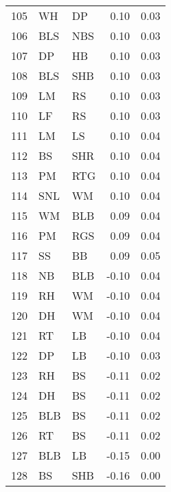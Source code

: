 \begin{table}[ht]
\begin{tabular}{rllrr}
  105 & WH & DP & 0.10 & 0.03 \\ 
  106 & BLS & NBS & 0.10 & 0.03 \\ 
  107 & DP & HB & 0.10 & 0.03 \\ 
  108 & BLS & SHB & 0.10 & 0.03 \\ 
  109 & LM & RS & 0.10 & 0.03 \\ 
  110 & LF & RS & 0.10 & 0.03 \\ 
  111 & LM & LS & 0.10 & 0.04 \\ 
  112 & BS & SHR & 0.10 & 0.04 \\ 
  113 & PM & RTG & 0.10 & 0.04 \\ 
  114 & SNL & WM & 0.10 & 0.04 \\ 
  115 & WM & BLB & 0.09 & 0.04 \\ 
  116 & PM & RGS & 0.09 & 0.04 \\ 
  117 & SS & BB & 0.09 & 0.05 \\ 
  118 & NB & BLB & -0.10 & 0.04 \\ 
  119 & RH & WM & -0.10 & 0.04 \\ 
  120 & DH & WM & -0.10 & 0.04 \\ 
  121 & RT & LB & -0.10 & 0.04 \\ 
  122 & DP & LB & -0.10 & 0.03 \\ 
  123 & RH & BS & -0.11 & 0.02 \\ 
  124 & DH & BS & -0.11 & 0.02 \\ 
  125 & BLB & BS & -0.11 & 0.02 \\ 
  126 & RT & BS & -0.11 & 0.02 \\ 
  127 & BLB & LB & -0.15 & 0.00 \\ 
  128 & BS & SHB & -0.16 & 0.00 \\ 
   \hline
\end{tabular}
\end{table}